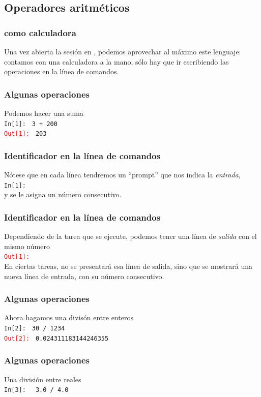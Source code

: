 {\subsection{Operadores aritméticos}
\begin{frame}
\frametitle{\python{} como calculadora}
Una vez abierta la sesión en \python, podemos aprovechar al máximo este lenguaje: contamos con una calculadora a la mano, sólo hay que ir escribiendo las operaciones en la línea de comandos.
\end{frame}
\begin{frame}[fragile]
\frametitle{Algunas operaciones}
Podemos hacer una suma
\\
\bigskip
\textcolor{ao}{\texttt{In[1]: }} \verb|3 + 200| \\
\pause
\textcolor{red}{\texttt{Out[1]: }} \verb|203|
\end{frame}
\begin{frame}[fragile]
\frametitle{Identificador en la línea de comandos}
Nótese que en cada línea tendremos un \enquote{prompt} que nos indica la \emph{entrada}, 
\\
\bigskip
\textcolor{ao}{\texttt{In[1]: }}
\pause
\\
\bigskip
y se le asigna un número consecutivo.
\end{frame}
\begin{frame}[fragile]
\frametitle{Identificador en la línea de comandos}
Dependiendo de la tarea que se ejecute, podemos tener una línea de \emph{salida} con el mismo número
\\
\bigskip
\textcolor{red}{\texttt{Out[1]: }}
\\
\bigskip
\pause
En ciertas tareas, no se presentará esa línea de salida, sino que se mostrará una nueva línea de entrada, con su número consecutivo.
\end{frame}
\begin{frame}[fragile]
\frametitle{Algunas operaciones}
Ahora hagamos una divisón entre enteros
\\
\bigskip
\textcolor{ao}{\texttt{In[2]: }} \verb|30 / 1234| \\
\pause
\textcolor{red}{\texttt{Out[2]: }} \verb|0.024311183144246355|
\end{frame}
\begin{frame}[fragile]
\frametitle{Algunas operaciones}
Una división entre reales
\\
\bigskip
\textcolor{ao}{\texttt{In[3]: }} \verb| 3.0 / 4.0| \\

\end{frame}}
